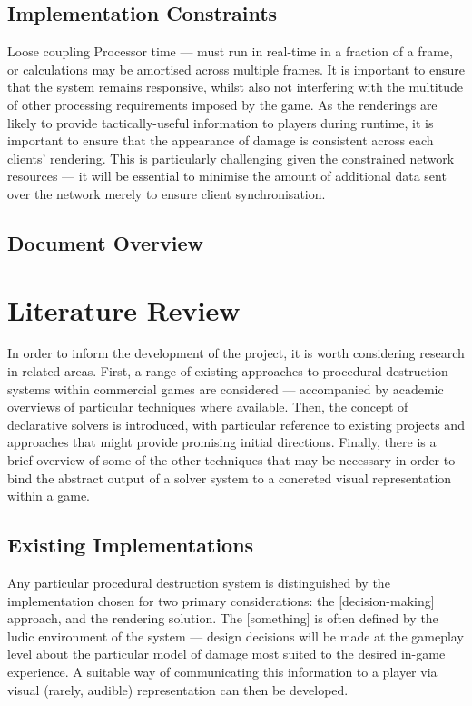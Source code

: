 \documentclass[11pt]{report}
\begin{document}
	\section{Implementation Constraints}
		Loose coupling
		Processor time --- must run in real-time in a fraction of a frame, or calculations may be amortised across multiple frames. It is important to ensure that the system remains responsive, whilst also not interfering with the multitude of other processing requirements imposed by the game.
		As the renderings are likely to provide tactically-useful information to players during runtime, it is important to ensure that the appearance of damage is consistent across each clients' rendering. This is particularly challenging given the constrained network resources --- it will be essential to minimise the amount of additional data sent over the network merely to ensure client synchronisation.

	\section{Document Overview}

\chapter{Literature Review}
	In order to inform the development of the project, it is worth considering research in related areas. First, a range of existing approaches to procedural destruction systems within commercial games are considered --- accompanied by academic overviews of particular techniques where available. Then, the concept of declarative solvers is introduced, with particular reference to existing projects and approaches that might provide promising initial directions. Finally, there is a brief overview of some of the other techniques that may be necessary in order to bind the abstract output of a solver system to a concreted visual representation within a game.

	\section{Existing Implementations}
		Any particular procedural destruction system is distinguished by the implementation chosen for two primary considerations: the [decision-making] approach, and the rendering solution. The [something] is often defined by the ludic environment of the system --- design decisions will be made at the gameplay level about the particular model of damage most suited to the desired in-game experience. A suitable way of communicating this information to a player via visual (rarely, audible) representation can then be developed.
\end{document}
